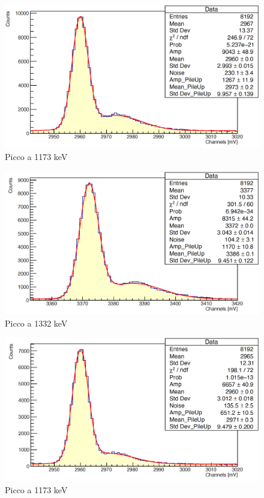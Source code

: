 \documentclass[a4paper,10pt]{article}
\begin{document}
\begin{figure}[H]
    \centering
    \includegraphics[scale=0.45]{appendice/spettri/CoPb1_58}
    \caption{Picco a 1173 keV}
\end{figure}
\begin{figure}[H]
    \centering
    \includegraphics[scale=0.45]{appendice/spettri/CoPb2_58}
    \caption{Picco a 1332 keV}
\end{figure}
\begin{figure}[H]
    \centering
    \includegraphics[scale=0.45]{appendice/spettri/CoPb1_108}
    \caption{Picco a 1173 keV}
\end{figure}
\end{document}
